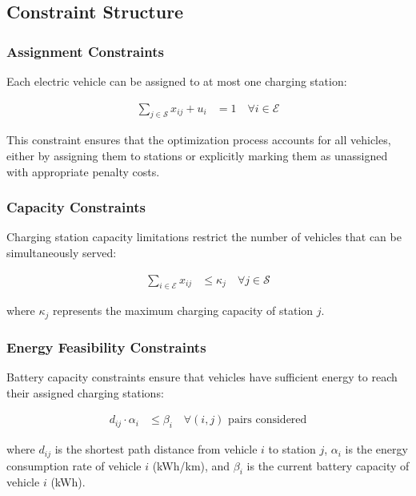 \documentclass[12pt,a4paper]{article}
\begin{document}
\subsection{Constraint Structure}

\subsubsection{Assignment Constraints}

Each electric vehicle can be assigned to at most one charging station:

\begin{align}
\sum_{j \in \mathcal{S}} x_{ij} + u_i &= 1 \quad \forall i \in \mathcal{E}
\end{align}

This constraint ensures that the optimization process accounts for all vehicles, either by assigning them to stations or explicitly marking them as unassigned with appropriate penalty costs.

\subsubsection{Capacity Constraints}

Charging station capacity limitations restrict the number of vehicles that can be simultaneously served:

\begin{align}
\sum_{i \in \mathcal{E}} x_{ij} &\leq \kappa_j \quad \forall j \in \mathcal{S}
\end{align}

where $\kappa_j$ represents the maximum charging capacity of station $j$.

\subsubsection{Energy Feasibility Constraints}

Battery capacity constraints ensure that vehicles have sufficient energy to reach their assigned charging stations:

\begin{align}
d_{ij} \cdot \alpha_i &\leq \beta_i \quad \forall (i,j) \text{ pairs considered}
\end{align}

where $d_{ij}$ is the shortest path distance from vehicle $i$ to station $j$, $\alpha_i$ is the energy consumption rate of vehicle $i$ (kWh/km), and $\beta_i$ is the current battery capacity of vehicle $i$ (kWh).
\end{document}
